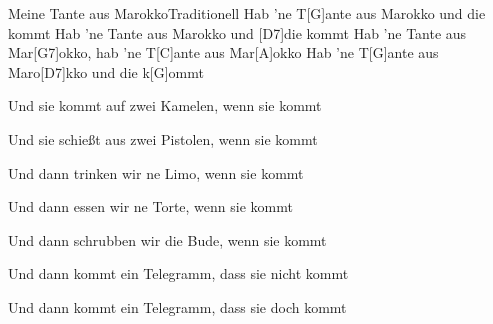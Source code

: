 \documentclass[../main.tex]{subfiles}
\begin{document}
\begin{songwithoutpagebreak}{Meine Tante aus Marokko}{Traditionell}{}
Hab 'ne T[G]ante aus Marokko und die kommt \hh{}
Hab 'ne Tante aus Marokko und [D7]die kommt \hh{}
Hab 'ne Tante aus Mar[G7]okko, hab 'ne T[C]ante aus Mar[A]okko
Hab 'ne T[G]ante aus Maro[D7]kko und die k[G]ommt \hh{}


Und sie kommt auf zwei Kamelen, wenn sie kommt \hh{}


Und sie schießt aus zwei Pistolen, wenn sie kommt \hh{}


Und dann trinken wir ne Limo, wenn sie kommt \hh{}


Und dann essen wir ne Torte, wenn sie kommt \hh{}


Und dann schrubben wir die Bude, wenn sie kommt \hh{}


Und dann kommt ein Telegramm, dass sie nicht kommt \hh{}


Und dann kommt ein Telegramm, dass sie doch kommt \hh{}
\end{songwithoutpagebreak}
\end{document}
